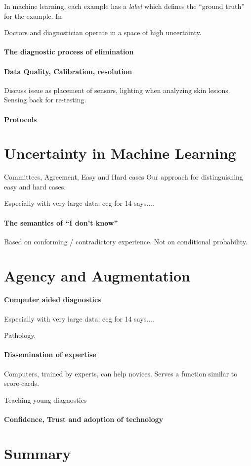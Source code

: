 \documentclass[fleqn,10pt]{wlscirep}
\begin{document}
In machine learning, each example has a {\em label} which defines the
``ground truth'' for the example. In~\cite{esteva2017dermatologist}


Doctors and diagnostician operate in a space of high uncertainty.

\paragraph*{The diagnostic process of elimination}
\paragraph*{Data Quality, Calibration, resolution}
Discuss issue as placement of sensors, lighting when analyzing skin
lesions. Sensing back for re-testing.
\paragraph*{Protocols}

\section*{Uncertainty in Machine Learning}
Committees, Agreement, Easy and Hard cases
Our approach for distinguishing easy and hard cases.

Especially with very large data: ecg for 14 says....

\paragraph*{The semantics of ``I don't know''}
Based on conforming / contradictory experience. Not on conditional
probability.


\section*{Agency and Augmentation}
\paragraph*{Computer aided diagnostics}
Especially with very large data: ecg for 14 says....

Pathology.

\paragraph*{Dissemination of expertise}
Computers, trained by experts, can help novices.  Serves a function
similar to score-cards.

Teaching young diagnostics
\paragraph*{Confidence, Trust and adoption of technology}

\section*{Summary}

 


\end{document}
